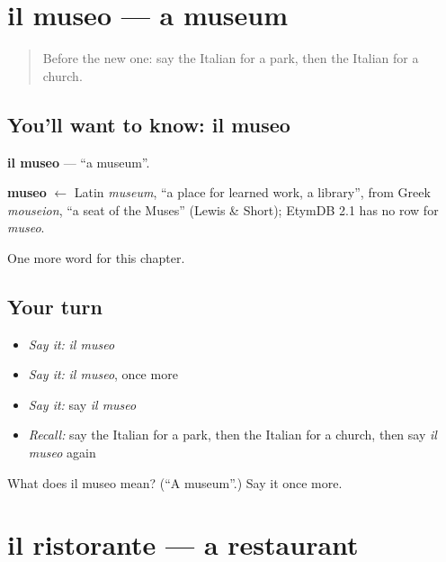 \section[il museo]{il museo — a museum}

\label{lesson:IT-C83-museo}



\begin{quote}
Before the new one: say the Italian for a park, then the Italian for a church.
\end{quote}

\subsection*{You'll want to know: il museo}
\textbf{il museo} — \textquotedblleft{}a museum\textquotedblright{}.

\begin{cousinweb}
\textbf{museo} $\leftarrow$ Latin \emph{museum}, \textquotedblleft{}a place for learned work, a library\textquotedblright{}, from Greek \emph{mouseion}, \textquotedblleft{}a seat of the Muses\textquotedblright{} (Lewis \& Short); EtymDB 2.1 has no row for \emph{museo}.
\end{cousinweb}

\begin{grammarlens}[title={What you've built}]
One more word for this chapter.
\end{grammarlens}

\subsection*{Your turn}
\begin{itemize}
\raggedright
  \item \emph{Say it:} \emph{il museo}
  \item \emph{Say it:} \emph{il museo}, once more
  \item \emph{Say it:} say \emph{il museo}
  \item \emph{Recall:} say the Italian for a park, then the Italian for a church, then say \emph{il museo} again
\end{itemize}

\begin{tcolorbox}[breakable,colback=teal!4,colframe=teal!35!black,title={Before you move on}]
What does il museo mean? (\textquotedblleft{}A museum\textquotedblright{}.) Say it once more.
\end{tcolorbox}
\section[il ristorante]{il ristorante — a restaurant}


